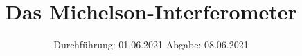 

\subject{Versuch Nr.V401
}
\title{Das Michelson-Interferometer}
\date{%
  Durchführung: 01.06.2021
  \hspace{3em}
  Abgabe: 08.06.2021
}



\maketitle
\thispagestyle{empty}
\tableofcontents
\newpage 








\nocite{*}

\printbibliography{}


